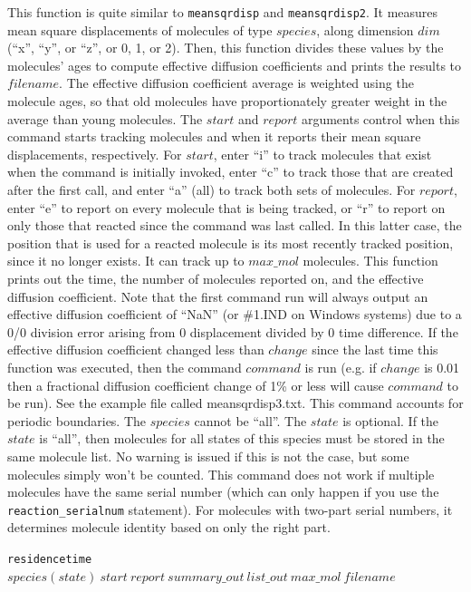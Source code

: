 \documentclass {book}
\newcommand {\ttt} {\texttt}
\begin{document}
\begin{description}
This function is quite similar to \ttt{meansqrdisp} and \ttt{meansqrdisp2}. It measures mean square displacements of molecules of type $species$, along dimension $dim$ (``x'', ``y'', or ``z'', or 0, 1, or 2). Then, this function divides these values by the molecules' ages to compute effective diffusion coefficients and prints the results to $filename$. The effective diffusion coefficient average is weighted using the molecule ages, so that old molecules have proportionately greater weight in the average than young molecules. The $start$ and $report$ arguments control when this command starts tracking molecules and when it reports their mean square displacements, respectively. For $start$, enter ``i'' to track molecules that exist when the command is initially invoked, enter ``c'' to track those that are created after the first call, and enter ``a'' (all) to track both sets of molecules. For $report$, enter ``e'' to report on every molecule that is being tracked, or ``r'' to report on only those that reacted since the command was last called. In this latter case, the position that is used for a reacted molecule is its most recently tracked position, since it no longer exists. It can track up to $max\_mol$ molecules. This function prints out the time, the number of molecules reported on, and the effective diffusion coefficient. Note that the first command run will always output an effective diffusion coefficient of ``NaN'' (or \#1.IND on Windows systems) due to a 0/0 division error arising from 0 displacement divided by 0 time difference. If the effective diffusion coefficient changed less than $change$ since the last time this function was executed, then the command $command$ is run (e.g. if $change$ is 0.01 then a fractional diffusion coefficient change of 1\% or less will cause $command$ to be run). See the example file called meansqrdisp3.txt. This command accounts for periodic boundaries. The $species$ cannot be ``all''. The $state$ is optional. If the $state$ is ``all'', then molecules for all states of this species must be stored in the same molecule list. No warning is issued if this is not the case, but some molecules simply won't be counted. This command does not work if multiple molecules have the same serial number (which can only happen if you use the \ttt{reaction\_serialnum} statement). For molecules with two-part serial numbers, it determines molecule identity based on only the right part.

\item{\ttt{residencetime} $species(state)\ start\ report\ summary\_out\ list\_out\ max\_mol\ filename$}


\end{description}
\end{document}
